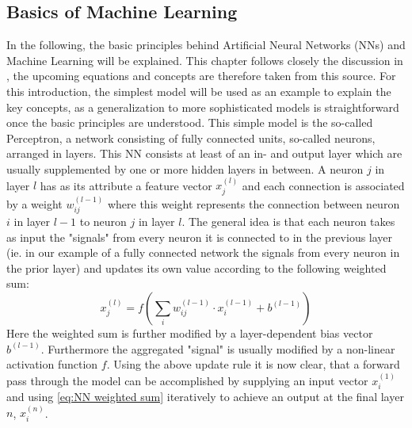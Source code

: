 \documentclass[11pt,a4paper]{article}
\begin{document}
\subsection{Basics of Machine Learning}
\label{ssec:BAsics of Machine Learning}
In the following, the basic principles behind Artificial Neural Networks (NNs) and Machine Learning will be explained. 
This chapter follows closely the discussion in \cite{kubatChapter5Artificial2017}, the upcoming equations and concepts are therefore taken from this source. 
For this introduction, the simplest model will be used as an example to explain the key concepts, as a generalization to more sophisticated models is straightforward once the basic principles are understood. 
This simple model is the so-called Perceptron, a network consisting of fully connected units, so-called neurons, arranged in layers. 
This NN consists at least of an in- and output layer which are usually supplemented by one or more hidden layers in between. 
A neuron $j$ in layer $l$ has as its attribute a feature vector $x^{(l)}_j$ and each connection is associated by a weight $w_{ij}^{(l-1)}$ where this weight represents the connection between neuron $i$ in layer $l-1$ to neuron $j$ in layer $l$. 
The general idea is that each neuron takes as input the "signals" from every neuron it is connected to in the previous layer (ie. in our example of a fully connected network the signals from every neuron in the prior layer) and updates its own value according to the following weighted sum:
\begin{equation}
\label{eq:NN weighted sum}
x^{(l)}_j = f\left(\sum_i w_{ij}^{(l-1)} \cdot x^{(l-1)}_i + b^{(l-1)}\right)
\end{equation}
Here the weighted sum is further modified by a layer-dependent bias vector $ b^{(l-1)}$. 
Furthermore the aggregated "signal" is usually modified by a non-linear activation function $f$. 
Using the above update rule it is now clear, that a forward pass through the model can be accomplished by supplying an input vector $x^{(1)}_i$ and using \autoref{eq:NN weighted sum} iteratively to achieve an output at the final layer $n$, $x^{(n)}_i$. \\
\end{document}
